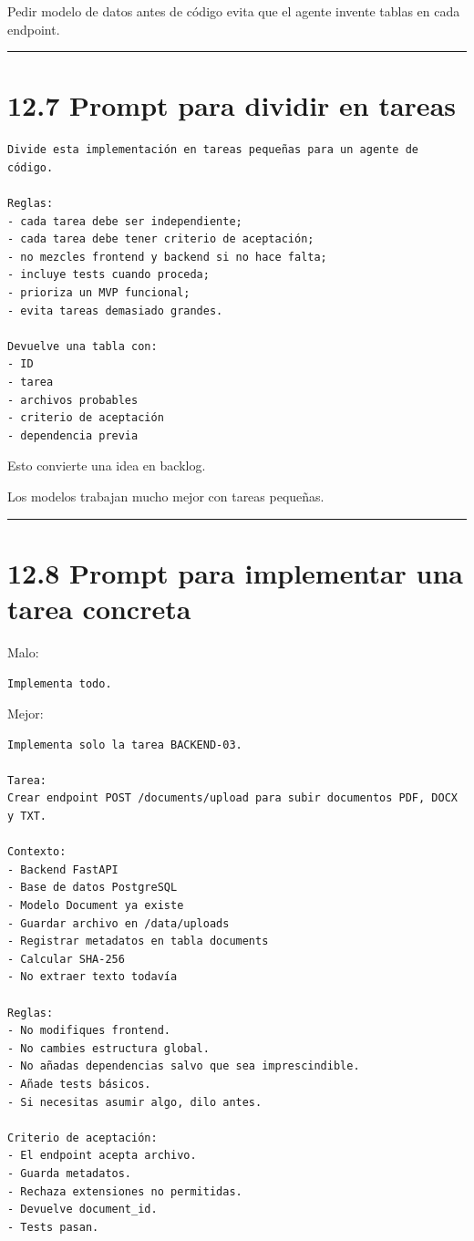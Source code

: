 Pedir modelo de datos antes de código evita que el agente invente tablas
en cada endpoint.

\begin{center}\rule{0.5\linewidth}{0.5pt}\end{center}

\section{12.7 Prompt para dividir en
tareas}\label{prompt-para-dividir-en-tareas}

\begin{lstlisting}
Divide esta implementación en tareas pequeñas para un agente de código.

Reglas:
- cada tarea debe ser independiente;
- cada tarea debe tener criterio de aceptación;
- no mezcles frontend y backend si no hace falta;
- incluye tests cuando proceda;
- prioriza un MVP funcional;
- evita tareas demasiado grandes.

Devuelve una tabla con:
- ID
- tarea
- archivos probables
- criterio de aceptación
- dependencia previa
\end{lstlisting}

Esto convierte una idea en backlog.

Los modelos trabajan mucho mejor con tareas pequeñas.

\begin{center}\rule{0.5\linewidth}{0.5pt}\end{center}

\section{12.8 Prompt para implementar una tarea
concreta}\label{prompt-para-implementar-una-tarea-concreta}

Malo:

\begin{lstlisting}
Implementa todo.
\end{lstlisting}

Mejor:

\begin{lstlisting}
Implementa solo la tarea BACKEND-03.

Tarea:
Crear endpoint POST /documents/upload para subir documentos PDF, DOCX y TXT.

Contexto:
- Backend FastAPI
- Base de datos PostgreSQL
- Modelo Document ya existe
- Guardar archivo en /data/uploads
- Registrar metadatos en tabla documents
- Calcular SHA-256
- No extraer texto todavía

Reglas:
- No modifiques frontend.
- No cambies estructura global.
- No añadas dependencias salvo que sea imprescindible.
- Añade tests básicos.
- Si necesitas asumir algo, dilo antes.

Criterio de aceptación:
- El endpoint acepta archivo.
- Guarda metadatos.
- Rechaza extensiones no permitidas.
- Devuelve document_id.
- Tests pasan.
\end{lstlisting}

